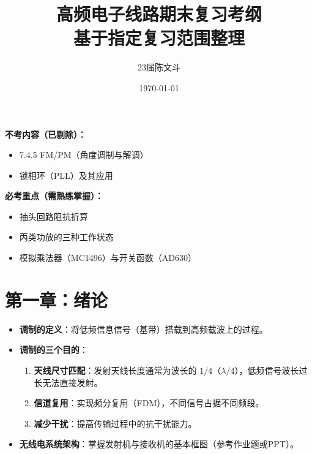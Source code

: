 \documentclass[a4paper,12pt]{ctexart}
\title{\textbf{高频电子线路期末复习考纲}\\ \large{基于指定复习范围整理}}
\author{23届陈文斗}
\date{\today}
\begin{document}
	\maketitle

	\begin{tcolorbox}[colback=red!5!white,colframe=red!75!black,title=复习特别提示]
		\textbf{不考内容（已剔除）：}
		\begin{itemize}
			\item 7.4.5 FM/PM（角度调制与解调）
			\item 锁相环（PLL）及其应用
		\end{itemize}
		\textbf{必考重点（需熟练掌握）：}
		\begin{itemize}
			\item 抽头回路阻抗折算
			\item 丙类功放的三种工作状态
			\item 模拟乘法器（MC1496）与开关函数（AD630）
		\end{itemize}
	\end{tcolorbox}

	\section{第一章：绪论}
	\begin{itemize}
		\item \textbf{调制的定义}：将低频信息信号（基带）搭载到高频载波上的过程。
		\item \textbf{调制的三个目的}：
		\begin{enumerate}
			\item \textbf{天线尺寸匹配}：发射天线长度通常为波长的 $1/4$（$\lambda/4$），低频信号波长过长无法直接发射。
			\item \textbf{信道复用}：实现频分复用（FDM），不同信号占据不同频段。
			\item \textbf{减少干扰}：提高传输过程中的抗干扰能力。
		\end{enumerate}
		\item \textbf{无线电系统架构}：掌握发射机与接收机的基本框图（参考作业题或PPT）。
	\end{itemize}
\end{document}
